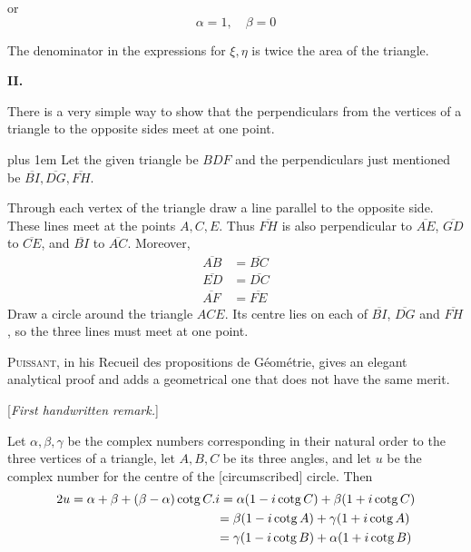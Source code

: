 %
or
\[
\alpha=1,\quad\beta=0
\]
\par
The denominator in the expressions for \(\xi,\eta\) is twice the area of the triangle.

\par\medskip{}
\centerline{\textbf{II.}}\nobreak\smallskip
There is a very simple way to show that the perpendiculars from the vertices of a triangle to the opposite sides meet at one point.

\begingroup\rightskip=0pt plus 1em
Let the given triangle be \(BDF\) and the perpendiculars just mentioned be \(\overline{BI},\overline{DG},\overline{FH}\).\par
\endgroup

Through each vertex of the triangle draw a line parallel to the opposite side. These lines meet at the points \(A,C,E\). Thus \(\overline{FH}\) is also perpendicular to \(\overline{AE}\), \(\overline{GD}\) to \(\overline{CE}\), and \(\overline{BI}\) to \(\overline{AC}\). Moreover,
\[
\begin{aligned}\overline{AB}&=\overline{BC}\\\overline{ED}&=\overline{DC}\\\overline{AF}&=\overline{FE}\end{aligned}
\]
Draw a circle around the triangle \(ACE\). Its centre lies on each of \(\overline{BI}\), \(\overline{DG}\) and \(\overline{FH}\), so the three lines must meet at one point.

\textsc{Puissant}, in his Recueil des propositions de Géométrie, gives an elegant analytical proof and adds a geometrical one that does not have the same merit.

\par\medskip{}
\begin{center}[\textit{First handwritten remark.}]\end{center}
\hspace*{\parindent}Let \(\alpha,\beta,\gamma\) be the complex numbers corresponding in their natural order to the three vertices of a triangle, let \(A,B,C\) be its three angles, and let \(u\) be the complex number for the centre of the [circumscribed] circle. Then
\begingroup\footnotesize
\[
\begin{aligned}
2u&=\alpha+\beta+(\beta-\alpha)\operatorname{cotg}C.i=\alpha(1-i\operatorname{cotg}C)+\beta(1+i\operatorname{cotg}C)\\
&\hphantom{=\alpha+\beta+(\beta-\alpha)\operatorname{cotg}C.i}=\beta(1-i\operatorname{cotg}A)+\gamma(1+i\operatorname{cotg}A)\\
&\hphantom{=\alpha+\beta+(\beta-\alpha)\operatorname{cotg}C.i}=\gamma(1-i\operatorname{cotg}B)+\alpha(1+i\operatorname{cotg}B)
\end{aligned}
\]
\endgroup
